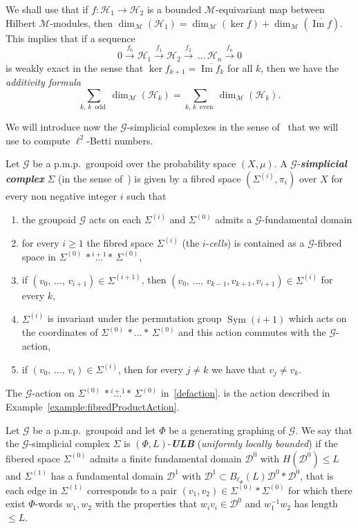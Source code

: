 \documentclass[AHL,Unicode,longabstracts,published]{cedram}
\newcommand{\defin}[1]{\textbf{\emph{#1}}}
\newcommand{\cM}{\mathcal{M}}
\newcommand{\cH}{\mathcal{H}}
\newcommand{\cg}{\mathcal{G}}
\newcommand{\cd}{\mathcal{D}}
\DeclareMathOperator{\Ima}{Im}
\DeclareMathOperator{\Sym}{Sym}
\newcommand{\pmp}{p.m.p.\ }
\begin{document}
We shall use that if $f \colon \cH_1 \to \cH_2$ is a bounded $\cM$-equivariant map between Hilbert $\cM$-modules, then $\dim_\cM(\cH_1)= \dim_\cM(\ker f) + \dim_\cM(\overline{\Ima f})$. This implies that if a sequence
\[
0 \xrightarrow{f_0} \cH_1 \xrightarrow{f_1} \cH_2 \xrightarrow{f_2}\,\dots\,\cH_n \xrightarrow{f_n} 0
\]
is weakly exact in the sense that $\ker f_{k+1} = \overline{\Ima f_k}$ for all $k$, then we have the \emph{additivity formula}
\[
\sum_{k,\,k\,\text{ odd }} \dim_\cM(\cH_k) = \sum_{k,\,k \,\text{ even }} \dim_\cM(\cH_k).
\]

We will introduce now the $\cg$-simplicial complexes in the sense of~\cite{gab_ihes} that we will use to compute $\ell^2$-Betti numbers.

\begin{defi}\label{def:gsimplicial}
Let $\cg$ be a \pmp groupoid over the probability space $(X,\mu)$. A $\cg$-\defin{simplicial complex} $\Sigma$ (in the sense of~\cite{gab_ihes}) is given by a fibred space $(\Sigma^{(i)}, \pi_i)$ over $X$ for every non negative integer $i$ such that
\begin{enumerate}
\item \label{defaction}
the groupoid $\cg$ acts on each $\Sigma^{(i)}$ and $\Sigma^{(0)}$ admits a $\cg$-fundamental domain

\item\label{item:subfibred}
for every $i\geq 1$ the fibred space $\Sigma^{(i)}$ (the $i$-\emph{cells}) is contained as a $\cg$-fibred space in $\Sigma^{(0)}\,*\stackrel{i+1}{\ldots}*\,\Sigma^{(0)}$,

\item\label{defboundary}
if $(v_0,\,\ldots,\,v_{i+1})\in\Sigma^{(i+1)}$, then $(v_0,\,\ldots,\,v_{k-1},v_{k+1},v_{i+1})\in\Sigma^{(i)}$ for every $k$,

\item\label{defi5.1.4} $\Sigma^{(i)}$ is invariant under the permutation group $\Sym(i+1)$ which acts on the coordinates of $\Sigma^{(0)}\,*\ldots*\,\Sigma^{(0)}$ and this action commutes with the $\cg$-action,

\item\label{defi5.1.5} if $(v_0,\,\ldots,\,v_{i})\in\Sigma^{(i)}$, then for every $j\neq k$ we have that $v_j\neq v_k$.
\end{enumerate}
The $\cg$-action on $\Sigma^{(0)}\,*\stackrel{i+1}{\ldots}*\,\Sigma^{(0)}$ in~\eqref{defaction}. is the action described in Example~\ref{example:fibredProductAction}.

Let $\cg$ be a \pmp groupoid and let $\Phi$ be a generating graphing of $\cg$. We say that the $\cg$-simplicial complex $\Sigma$ is $(\Phi,L)$-\defin{ULB} (\emph{uniformly locally bounded}) if the fibered space $\Sigma^{(0)}$ admits a finite fundamental domain $\cd^0$ with $H(\cd^0)\leq L$ and $\Sigma^{(1)}$ has a fundamental domain $\cd^1$ with $\cd^1\subset B_{\ell_\Phi}(L)\cd^0*\cd^0$, that is each edge in $\Sigma^{(1)}$ corresponds to a pair $(v_1,v_2)\in \Sigma^{(0)}*\Sigma^{(0)}$ for which there exist $\Phi$-words $w_1, w_2$ with the properties that $w_iv_i\in \cd^0$ and $w_1^{-1}w_2$ has length $\leq L$.
\end{defi}
\end{document}

